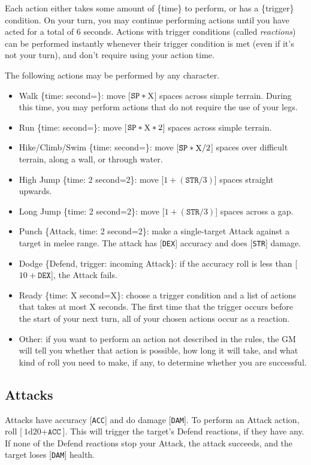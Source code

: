 \documentclass[12pt]{article}
\newcommand{\STR}{\texttt{STR}}
\newcommand{\DEX}{\texttt{DEX}}
\newcommand{\SP}{\texttt{SP}}
\newcommand{\ACC}{\texttt{ACC}}
\newcommand{\DAM}{\texttt{DAM}}
\newcommand{\X}{\text{{\lower 0.2mm \hbox{X}}}}
\newcommand{\TIME}[1]{\{time: #1 second\if1=#1{}\else{s}\fi\}}
\newcommand{\Attack}[1]{\{Attack, time: #1 second\if1=#1{}\else{s}\fi\}}
\newcommand{\Defend}{\{Defend, trigger: incoming Attack\}}
\newcommand{\dice}[2]{\text{#1d#2}}
\begin{document}
Each action either takes some amount of \{time\} to perform, or has a \{trigger\} condition. On your turn, you may continue performing actions until you have acted for a total of 6 seconds. Actions with trigger conditions (called \textit{reactions}) can be performed instantly whenever their trigger condition is met (even if it’s not your turn), and don’t require using your action time.

The following actions may be performed by any character.
\begin{itemize}
\item Walk \TIME{\X}: move [$\SP * \X$] spaces across simple terrain. During this time, you may perform actions that do not require the use of your legs.
\item Run \TIME{\X}: move [$\SP * \X * 2$] spaces across simple terrain.
\item Hike/Climb/Swim \TIME{\X}: move [$\SP * \X / 2$] spaces over difficult terrain, along a wall, or through water.
\item High Jump \TIME{2}: move [$1 + (\STR / 3)$] spaces straight upwards.
\item Long Jump \TIME{2}: move [$1 + (\STR / 3)$] spaces across a gap.
\item Punch \Attack{2}: make a single-target Attack against a target in melee range. The attack has [\DEX{}] accuracy and does [\STR{}] damage.
\item Dodge \Defend: if the accuracy roll is less than [$10 + \DEX{}$], the Attack fails.
\item Ready \TIME{X}: choose a trigger condition and a list of actions that takes at most X seconds. The first time that the trigger occurs before the start of your next turn, all of your chosen actions occur as a reaction.
\item Other: if you want to perform an action not described in the rules, the GM will tell you whether that action is possible, how long it will take, and what kind of roll you need to make, if any, to determine whether you are successful.
\end{itemize}

\subsection{Attacks}

Attacks have accuracy [\ACC] and do damage [\DAM]. To perform an Attack action, roll [$\dice{1}{20} + \ACC$]. This will trigger the target’s Defend reactions, if they have any. If none of the Defend reactions stop your Attack, the attack succeeds, and the target loses [\DAM] health.
\end{document}
